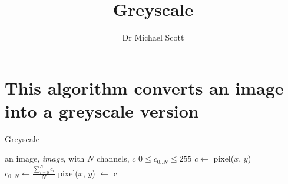 \documentclass{../../../fal_assignment}
\title{Greyscale}
\author{Dr Michael Scott}
\begin{document}
\maketitle

	\section{This algorithm converts an image into a greyscale version}

	\begin{algorithm}[ht]
	\caption{Greyscale}
	\label{alg:algorithm}
	
	\begin{algorithmic}[1]
			\Require 
			\Statex an image, \textit{image}, with $N$ channels, $c$
			\Statex $0 \leq c_{0..N} \leq 255$
			\State $c \leftarrow$ pixel($x$, $y$)
			\State $c_{0..N} \leftarrow \frac{\sum_{i=0}^{N} c_i}{N}$
			\State pixel($x$, $y$) $\leftarrow$ c
			\EndFor
			\EndProcedure
	\end{algorithmic}
	
	\end{algorithm}
\end{document}
